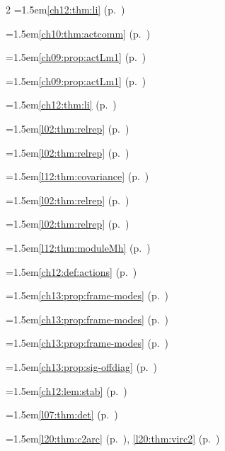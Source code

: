 \begin{multicols}{2}
\hangindent=1.5em\quad \ref{ch12:thm:li} (p.~\pageref{ch12:thm:li})\par
\hangindent=1.5em\quad \ref{ch10:thm:actcomm} (p.~\pageref{ch10:thm:actcomm})\par
\hangindent=1.5em\quad \ref{ch09:prop:actLm1} (p.~\pageref{ch09:prop:actLm1})\par
\hangindent=1.5em\quad \ref{ch09:prop:actLm1} (p.~\pageref{ch09:prop:actLm1})\par
\hangindent=1.5em\quad \ref{ch12:thm:li} (p.~\pageref{ch12:thm:li})\par
\hangindent=1.5em\quad \ref{l02:thm:relrep} (p.~\pageref{l02:thm:relrep})\par
\hangindent=1.5em\quad \ref{l02:thm:relrep} (p.~\pageref{l02:thm:relrep})\par
\hangindent=1.5em\quad \ref{l12:thm:covariance} (p.~\pageref{l12:thm:covariance})\par
\hangindent=1.5em\quad \ref{l02:thm:relrep} (p.~\pageref{l02:thm:relrep})\par
\hangindent=1.5em\quad \ref{l02:thm:relrep} (p.~\pageref{l02:thm:relrep})\par
\hangindent=1.5em\quad \ref{l12:thm:moduleMh} (p.~\pageref{l12:thm:moduleMh})\par
\hangindent=1.5em\quad \ref{ch12:def:actions} (p.~\pageref{ch12:def:actions})\par
\hangindent=1.5em\quad \ref{ch13:prop:frame-modes} (p.~\pageref{ch13:prop:frame-modes})\par
\hangindent=1.5em\quad \ref{ch13:prop:frame-modes} (p.~\pageref{ch13:prop:frame-modes})\par
\hangindent=1.5em\quad \ref{ch13:prop:frame-modes} (p.~\pageref{ch13:prop:frame-modes})\par
\hangindent=1.5em\quad \ref{ch13:prop:sig-offdiag} (p.~\pageref{ch13:prop:sig-offdiag})\par
\hangindent=1.5em\quad \ref{ch12:lem:stab} (p.~\pageref{ch12:lem:stab})\par
\hangindent=1.5em\quad \ref{l07:thm:det} (p.~\pageref{l07:thm:det})\par
\hangindent=1.5em\quad \ref{l20:thm:c2arc} (p.~\pageref{l20:thm:c2arc}), \ref{l20:thm:virc2} (p.~\pageref{l20:thm:virc2})\par

\end{multicols}
